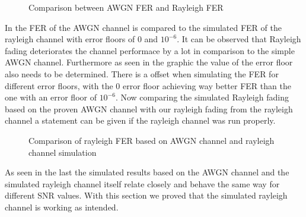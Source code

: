 \begin{figure}[!h]
	\setlength{}
	\setlength\fheight{0.4\textheight}
	\centering
	
	\caption{Comparison between AWGN FER and Rayleigh FER}
	\label{fig:FERAWGNRAY}
\end{figure}
\newpage
In  the \gls{FER} of the AWGN channel is compared to the simulated \gls{FER} of the rayleigh channel with error floors of $0$ and $10^{-6}$. It can be observed that Rayleigh fading deteriorates the channel performace by a lot in comparison to the simple AWGN channel. Furthermore as seen in the graphic the value of the error floor also needs to be determined. There is a offset when simulating the \gls{FER} for different error floors, with the 0 error floor achieving way better \gls{FER} than the one with an error floor of $10^{-6}$. Now comparing the simulated Rayleigh fading based on the proven AWGN channel with our rayleigh fading from the rayleigh channel a statement can be given if the rayleigh channel was run properly.
\newpage
\begin{figure}[!htb]
	\setlength{}
	\setlength\fheight{0.4\textheight}
	\centering
	
	\caption{Comparison of rayleigh FER based on AWGN channel and rayleigh channel simulation}
	\label{fig:AWGNRAYCOMP}
\end{figure}
As seen in the last  the simulated results based on the AWGN channel and the simulated rayleigh channel itself relate closely and behave the same way for different \gls{SNR} values. With this section we proved that the simulated rayleigh channel is working as intended. 

\clearpage

